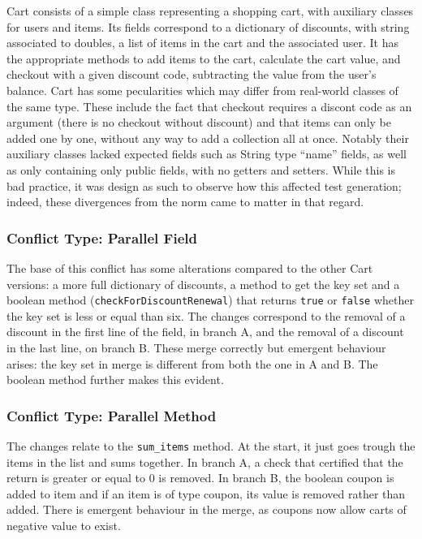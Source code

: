 Cart consists of a simple class representing a shopping cart, with auxiliary classes for users and items.
Its fields correspond to a dictionary of discounts, with string associated to doubles, a list of items in the cart
and the associated user.
It has the appropriate methods to add items to the cart, calculate the cart value, and checkout with a given discount code,
subtracting the value from the user's balance.
Cart has some pecularities which may differ from real-world classes of the same type. These include the fact that checkout
requires a discont code as an argument (there is no checkout without discount) and that items can only be added one by one, without
any way to add a collection all at once.  Notably their auxiliary classes lacked expected fields such as String type ``name'' fields,
as well as only containing only public fields, with no getters and setters. While this is bad practice, it was design as such to
observe how this affected test generation; indeed, these divergences from the norm came to matter in that regard.

\subsubsection{Conflict Type: Parallel Field}

The base of this conflict has some alterations compared to the other Cart versions: a more full dictionary of discounts,
a method to get the key set and a boolean method (\texttt{checkForDiscountRenewal}) that returns \texttt{true} or \texttt{false} whether the key set is less or equal than six.
The changes correspond to the removal of a discount in the first line of the field, in branch A, and the removal of a discount in the last line, on branch B.
These merge correctly but emergent behaviour arises: the key set in merge is different from both the one in A and B.
The boolean method further makes this evident.

\subsubsection{Conflict Type: Parallel Method}

The changes relate to the \texttt{sum\_items} method. At the start, it just goes trough the items in the list and sums together. In branch A,
a check that certified that the return is greater or equal to 0 is removed. In branch B, the boolean coupon is added to item and if an item
is of type coupon, its value is removed rather than added. There is emergent behaviour in the merge, as coupons now allow carts of negative
value to exist.

